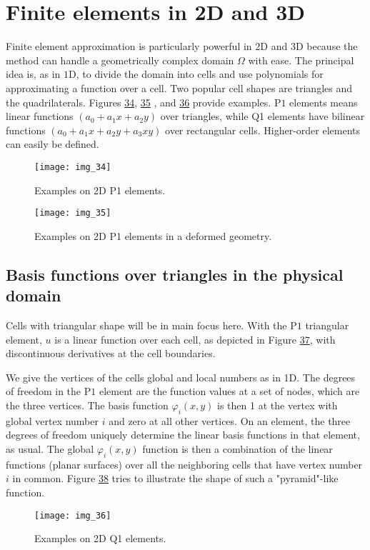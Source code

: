 \documentclass[../main.tex]{subfiles}
\begin{document}
\chapter{Finite elements in 2D and 3D}
\label{chap:chap_9}
\noindent Finite element approximation is particularly powerful in $2 \mathrm{D}$ and 3D because the method can handle a geometrically complex domain $\Omega$ with ease. The principal idea is, as in $1 \mathrm{D}$, to divide the domain into cells and use polynomials for approximating a function over a cell. Two popular cell shapes are triangles and the quadrilaterals. Figures \hyperref[fig:img_34]{34}, \hyperref[fig:img_35]{35} , and \hyperref[fig:img_36]{36} provide examples. $\mathrm{P} 1$ elements means linear functions $\left(a_{0}+a_{1} x+a_{2} y\right)$ over triangles, while Q1 elements have bilinear functions $\left(a_{0}+a_{1} x+a_{2} y+a_{3} x y\right)$ over rectangular cells. Higher-order elements can easily be defined.
\begin{figure}[H]
	\centering
	\texttt{[image: img\_34]}
	\caption{Examples on 2D P1 elements.}
	\label{fig:img_34}
\end{figure}
\begin{figure}[H]
	\centering
	\texttt{[image: img\_35]}
	\caption{Examples on 2D P1 elements in a deformed geometry.}
	\label{fig:img_35}
\end{figure}
\section[Basis functions over triangles in the physical domain]{Basis functions over triangles in the physical domain}
\label{sec:sec_9_1}
\noindent Cells with triangular shape will be in main focus here. With the $\mathrm{P} 1$ triangular element, $u$ is a linear function over each cell, as depicted in Figure \hyperref[fig:img_37]{37}, with discontinuous derivatives at the cell boundaries.

We give the vertices of the cells global and local numbers as in 1D. The degrees of freedom in the $\mathrm{P} 1$ element are the function values at a set of nodes, which are the three vertices. The basis function $\varphi_{i}(x, y)$ is then 1 at the vertex with global vertex number $i$ and zero at all other vertices. On an element, the three degrees of freedom uniquely determine the linear basis functions in that element, as usual. The global $\varphi_{i}(x, y)$ function is then a combination of the linear functions (planar surfaces) over all the neighboring cells that have vertex number $i$ in common. Figure \hyperref[fig:img_38]{38} tries to illustrate the shape of such a "pyramid"-like function.
\begin{figure}[H]
	\centering
	\texttt{[image: img\_36]}
	\caption{Examples on 2D Q1 elements.}
	\label{fig:img_36}
\end{figure}
\end{document}
